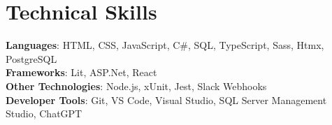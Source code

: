 \documentclass[letterpaper,11pt]{article}
\begin{document}
\section{Technical Skills}
 \begin{itemize}[leftmargin=0.15in, label={}]
    \small{\item{
     \textbf{Languages}{: HTML, CSS, JavaScript, C\#, SQL, TypeScript, Sass, Htmx, PostgreSQL } \\
     \textbf{Frameworks}{: Lit, ASP.Net, React} \\
     \textbf{Other Technologies}{: Node.js, xUnit, Jest, Slack Webhooks} \\
     \textbf{Developer Tools}{: Git, VS Code, Visual Studio, SQL Server Management Studio, ChatGPT } \\
    }}
 \end{itemize}


\end{document}
